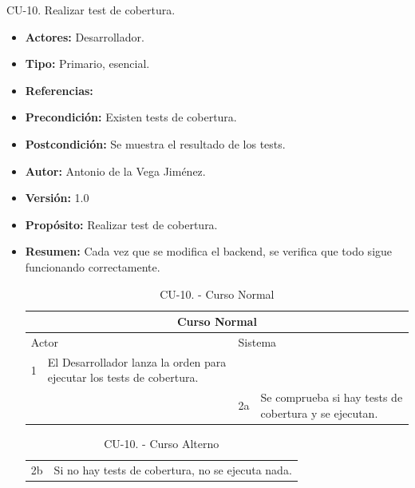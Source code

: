   \item CU-10. Realizar test de cobertura.
  \begin{itemize}
    \item \textbf{Actores:} Desarrollador.
    \item \textbf{Tipo:} Primario, esencial.
    \item \textbf{Referencias:}
    \item \textbf{Precondición:} Existen tests de cobertura.
    \item \textbf{Postcondición:} Se muestra el resultado de los tests.
    \item \textbf{Autor:} Antonio de la Vega Jiménez.
    \item \textbf{Versión:} 1.0
    \item \textbf{Propósito:} Realizar test de cobertura.
    \item \textbf{Resumen:} Cada vez que se modifica el backend, se verifica que todo sigue funcionando correctamente.
    \begin{table}[H]
      \centering
      \begin{tabularx}{\textwidth}{|l|X|l|X|}
        \hline
        \multicolumn{4}{|c|}{\cellcolor[HTML]{C0C0C0}Curso Normal}                                                 \\ \hline
        \multicolumn{2}{|l|}{\cellcolor[HTML]{EFEFEF}Actor} & \multicolumn{2}{l|}{\cellcolor[HTML]{EFEFEF}Sistema} \\ \hline
        1                         & El Desarrollador lanza la orden para ejecutar los tests de cobertura.                        &                            &                         \\ \hline
                                  &                         & 2a                          & Se comprueba si hay tests de cobertura y se ejecutan.                       \\ \hline

                                  
      \end{tabularx}
      \caption{CU-10. - Curso Normal}
      \label{my-label}
    \end{table}
    \begin{table}[H]
      \centering
      \begin{tabularx}{\textwidth}{|l|X|}
       \hline
       \rowcolor[HTML]{C0C0C0} 
       \multicolumn{2}{|l|}{\cellcolor[HTML]{C0C0C0}Curso Alterno} \\ \hline
       \rowcolor[HTML]{FFFFFF} 
              2b                      & Si no hay tests de cobertura, no se ejecuta nada.                            \\ \hline
      \end{tabularx}
      \caption{CU-10. - Curso Alterno}
      \label{my-label}
    \end{table}
  \end{itemize}
